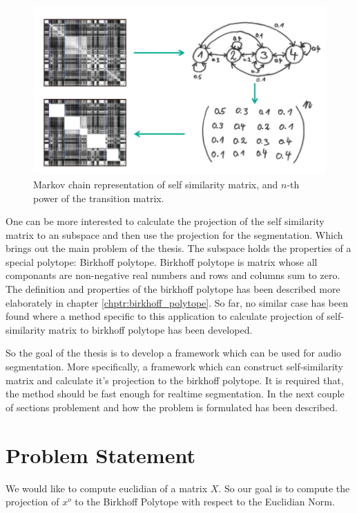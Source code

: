 \begin{figure}[h]
\centering
\includegraphics[scale=0.5]{Figures/markov.png}
\decoRule
\caption[hypercube]{Markov chain representation of self similarity matrix, and $n$-th power of the transition matrix.}
\label{fig:self_similarity}
\end{figure}



One can be more interested to calculate the projection of the self similarity matrix to an subspace and then use the projection for the segmentation. Which brings out the main problem of the thesis. The subspace holds the properties of a special polytope: Birkhoff polytope. Birkhoff polytope is matrix  whose all componants are non-negative real numbers and rows and columns sum to zero. The definition and properties of the birkhoff polytope has been described more elaborately in chapter \ref{chptr:birkhoff_polytope}. So far, no similar case has been found where a method specific to this application to calculate projection of self-similarity matrix to birkhoff polytope has been developed.

So the goal of the thesis is to develop a framework which can be used for audio segmentation. More specifically, a framework which can construct self-similarity matrix and calculate it's projection to the birkhoff polytope. It is required that, the method should be fast enough for realtime segmentation. In the next couple of sections problement and how the problem is formulated has been described.
 
\section{Problem Statement}

We would like to compute euclidian of a matrix $X$. So our goal is to compute the projection of $x^o$ to the Birkhoff Polytope with respect to the Euclidian Norm.

